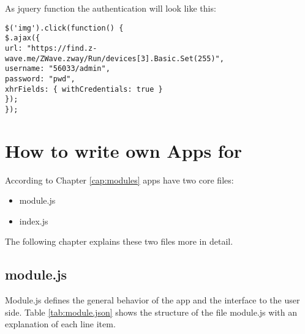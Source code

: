 As jquery function the authentication will look like this:

\begin{lstlisting}[caption=Login with jQuery]
$('img').click(function() {
$.ajax({
url: "https://find.z-wave.me/ZWave.zway/Run/devices[3].Basic.Set(255)",
username: "56033/admin",
password: "pwd",
xhrFields: { withCredentials: true }
});
});
\end{lstlisting}

\section{How to write own Apps for \zway}
\label{developownapps}

According to Chapter \ref{cap:modules} apps have two core files:

\begin{itemize}
\item module.js
\item index.js
\end{itemize}

The following chapter explains these two files more in detail. 

\subsection{module.js}

Module.js defines the general behavior of the app and the interface to the user side.
Table \ref{tab:module.json} 
shows the structure of the file module.js with an explanation of each line item.

